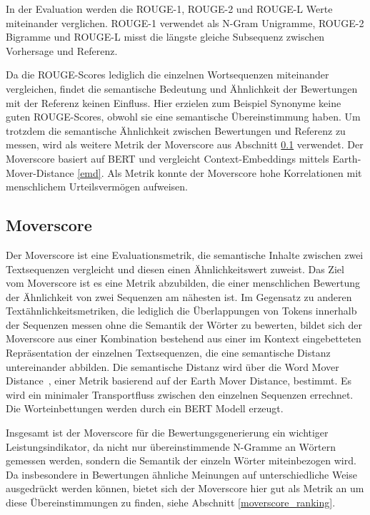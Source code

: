 In der Evaluation werden die ROUGE-1, ROUGE-2 und ROUGE-L Werte miteinander verglichen.
ROUGE-1 verwendet als N-Gram Unigramme, ROUGE-2 Bigramme und ROUGE-L misst die längste gleiche Subsequenz zwischen Vorhersage und Referenz.

Da die ROUGE-Scores lediglich die einzelnen Wortsequenzen miteinander vergleichen, findet die semantische Bedeutung und Ähnlichkeit der Bewertungen mit der Referenz keinen Einfluss.
Hier erzielen zum Beispiel Synonyme keine guten ROUGE-Scores, obwohl sie eine semantische Übereinstimmung haben.
Um trotzdem die semantische Ähnlichkeit zwischen Bewertungen und Referenz zu messen, wird als weitere Metrik der Moverscore aus Abschnitt \ref{moverscore} verwendet.
Der Moverscore basiert auf BERT und vergleicht Context-Embeddings mittels Earth-Mover-Distance \ref{emd}. Als Metrik konnte der Moverscore hohe Korrelationen mit menschlichem Urteilsvermögen aufweisen.


\subsection{Moverscore}
\label{moverscore}
Der Moverscore \citep{moverscore_paper} ist eine Evaluationsmetrik, die semantische Inhalte zwischen zwei Textsequenzen vergleicht und diesen einen Ähnlichkeitswert zuweist.
Das Ziel vom Moverscore ist es eine Metrik abzubilden, die einer menschlichen Bewertung der Ähnlichkeit von zwei Sequenzen am nähesten ist. 
Im Gegensatz zu anderen Textähnlichkeitsmetriken, die lediglich die Überlappungen von Tokens innerhalb der Sequenzen messen ohne die Semantik der Wörter zu bewerten, 
bildet sich der Moverscore aus einer Kombination bestehend aus einer im Kontext eingebetteten Repräsentation der einzelnen Textsequenzen, die eine semantische Distanz untereinander abbilden.
Die semantische Distanz wird über die Word Mover Distance \citep{wordmoverdistance}, einer Metrik basierend auf der Earth Mover Distance, bestimmt. Es wird ein minimaler Transportfluss zwischen den einzelnen Sequenzen errechnet.
Die Worteinbettungen werden durch ein BERT Modell erzeugt.

Insgesamt ist der Moverscore für die Bewertungsgenerierung ein wichtiger Leistungsindikator, da nicht nur übereinstimmende N-Gramme an Wörtern gemessen werden, sondern die Semantik der einzeln Wörter miteinbezogen wird. 
Da insbesondere in Bewertungen ähnliche Meinungen auf unterschiedliche Weise ausgedrückt werden können, bietet sich der Moverscore hier gut als Metrik an um diese Übereinstimmungen zu finden, siehe Abschnitt \ref{moverscore_ranking}.


